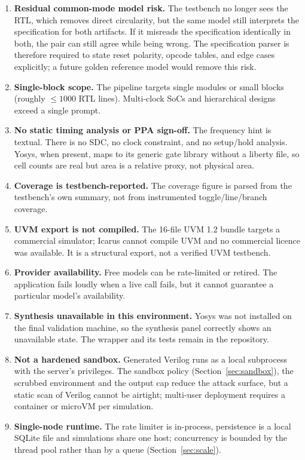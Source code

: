 \documentclass[11pt,a4paper]{article}
\newcommand{\code}[1]{\texttt{\detokenize{#1}}}
\begin{document}
\begin{enumerate}[label=\textbf{L\arabic*.},ref=L\arabic*]
\item \textbf{Residual common-mode model risk.} The testbench no longer sees the
RTL, which removes direct circularity, but the same model still interprets the
specification for both artifacts. If it misreads the specification identically in
both, the pair can still agree while being wrong. The specification parser is
therefore required to state reset polarity, opcode tables, and edge cases
explicitly; a future golden reference model would remove this risk.
\item \textbf{Single-block scope.} The pipeline targets single modules or small
blocks (roughly $\le 1000$ RTL lines). Multi-clock SoCs and hierarchical designs
exceed a single prompt.
\item \textbf{No static timing analysis or PPA sign-off.} The frequency hint is
textual. There is no SDC, no clock constraint, and no setup/hold analysis. Yosys,
when present, maps to its generic gate library without a liberty file, so cell
counts are real but area is a relative proxy, not physical area.
\item \textbf{Coverage is testbench-reported.} The coverage figure is parsed from
the testbench's own summary, not from instrumented toggle/line/branch coverage.
\item \textbf{UVM export is not compiled.} The 16-file UVM 1.2 bundle targets a
commercial simulator; Icarus cannot compile UVM and no commercial licence was
available. It is a structural export, not a verified UVM testbench.
\item \textbf{Provider availability.} Free models can be rate-limited or retired.
The application fails loudly when a live call fails, but it cannot guarantee a
particular model's availability.
\item \textbf{Synthesis unavailable in this environment.} Yosys was not installed
on the final validation machine, so the synthesis panel correctly shows an
unavailable state. The wrapper and its tests remain in the repository.
\item \textbf{Not a hardened sandbox.} Generated Verilog runs as a local \code{vvp} subprocess with the server's privileges. The sandbox policy (Section~\ref{sec:sandbox}), the scrubbed environment and the output cap reduce the attack surface, but a static scan of Verilog cannot be airtight; multi-user deployment requires a container or microVM per simulation.
\item \textbf{Single-node runtime.} The rate limiter is in-process, persistence is a local SQLite file and simulations share one host; concurrency is bounded by the thread pool rather than by a queue (Section~\ref{sec:scale}).
\end{enumerate}
\end{document}
